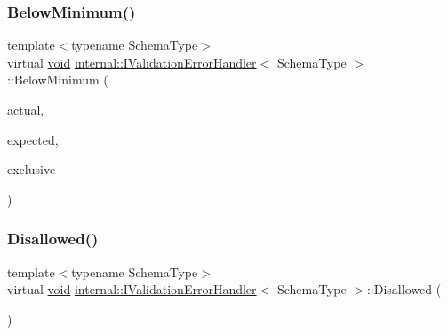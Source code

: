 \mbox{\label{classinternal_1_1IValidationErrorHandler_a921da9a7fa127035a2a259b19813230e}} 
\subsubsection{\texorpdfstring{Below\+Minimum()}{BelowMinimum()}\hspace{0.1cm}{\footnotesize\ttfamily [3/3]}}
{\footnotesize\ttfamily template$<$typename Schema\+Type$>$ \\
virtual \hyperlink{imgui__impl__opengl3__loader_8h_ac668e7cffd9e2e9cfee428b9b2f34fa7}{void} \hyperlink{classinternal_1_1IValidationErrorHandler}{internal\+::\+I\+Validation\+Error\+Handler}$<$ Schema\+Type $>$\+::Below\+Minimum (\begin{DoxyParamCaption}\item[{double}]{actual,  }\item[{const \hyperlink{classinternal_1_1IValidationErrorHandler_a22eda6c4ea9537f1ba00d76af052649a}{S\+Value} \&}]{expected,  }\item[{bool}]{exclusive }\end{DoxyParamCaption})\hspace{0.3cm}{\ttfamily [pure virtual]}}

\mbox{\label{classinternal_1_1IValidationErrorHandler_a570a6723282e6c0576a47c492ffe5602}} 
\subsubsection{\texorpdfstring{Disallowed()}{Disallowed()}}
{\footnotesize\ttfamily template$<$typename Schema\+Type$>$ \\
virtual \hyperlink{imgui__impl__opengl3__loader_8h_ac668e7cffd9e2e9cfee428b9b2f34fa7}{void} \hyperlink{classinternal_1_1IValidationErrorHandler}{internal\+::\+I\+Validation\+Error\+Handler}$<$ Schema\+Type $>$\+::Disallowed (\begin{DoxyParamCaption}{ }\end{DoxyParamCaption})\hspace{0.3cm}{\ttfamily [pure virtual]}}



